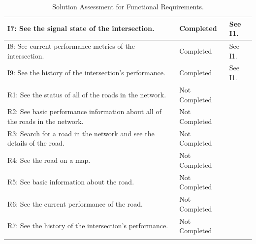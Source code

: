 \documentclass{report}
\begin{document}
\begin{longtable}[H]{| P{6.5cm} | P{2.5cm} | P{6cm} |}
    I7: See the signal state of the intersection.                                          & Completed     & See I1.                                                                               \\ \hline
    I8: See current performance metrics of the intersection.                               & Completed     & See I1.                                                                               \\ \hline
    I9: See the history of the intersection's performance.                                 & Completed     & See I1.                                                                               \\ \hline
    R1: See the status of all of the roads in the network.                                 & Not Completed & ~                                                                                     \\ \hline
    R2: See basic performance information about all of the roads in the network.           & Not Completed & ~                                                                                     \\ \hline
    R3: Search for a road in the network and see the details of the road.                  & Not Completed & ~                                                                                     \\ \hline
    R4: See the road on a map.                                                             & Not Completed & ~                                                                                     \\ \hline
    R5: See basic information about the road.                                              & Not Completed & ~                                                                                     \\ \hline
    R6: See the current performance of the road.                                           & Not Completed & ~                                                                                     \\ \hline
    R7: See the history of the intersection's performance.                                 & Not Completed & ~                                                                                     \\ \hline
\caption{Solution Assessment for Functional Requirements.}
\label{table:freqassessment}
\end{longtable}
\end{document}
